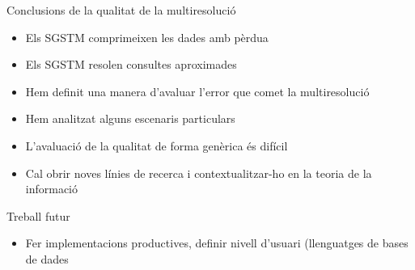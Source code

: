 \begin{frame}{Conclusions de la qualitat de la multiresolució}

  \begin{itemize}
  \item Els SGSTM comprimeixen les dades amb pèrdua
  \item Els SGSTM resolen consultes aproximades
  \item Hem definit una manera d’avaluar l’error que comet la multiresolució
  \item Hem analitzat alguns escenaris particulars
  \item L’avaluació de la qualitat de forma genèrica és difícil
  \item Cal obrir noves línies de recerca i contextualitzar-ho en la teoria de la informació
  \end{itemize}
\end{frame}

\begin{frame}{Treball futur}

  \begin{itemize}
  \item Fer implementacions productives, definir nivell d’usuari (llenguatges de bases de dades
  \end{itemize}

\end{frame}



